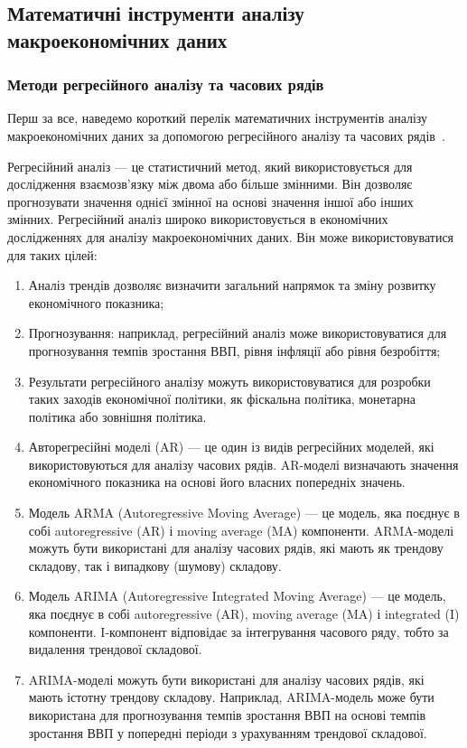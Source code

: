 \subsection{Математичні інструменти аналізу макроекономічних даних  }

\subsubsection{Методи регресійного аналізу та часових рядів}

Перш за все, наведемо короткий перелік математичних інструментів аналізу макроекономічних даних за допомогою регресійного аналізу та часових рядів~\cite{Biduk2016}.

Регресійний аналіз --- це статистичний метод, який використовується для дослідження взаємозв'язку між двома або більше змінними. Він дозволяє прогнозувати значення однієї змінної на основі значення іншої або інших змінних.
Регресійний аналіз широко використовується в економічних дослідженнях для аналізу макроекономічних даних. Він може використовуватися для таких цілей:
\begin{enumerate}
    \item Аналіз трендів дозволяє визначити загальний напрямок та зміну розвитку економічного показника;
    \item Прогнозування: наприклад, регресійний аналіз може використовуватися для прогнозування темпів зростання ВВП, рівня інфляції або рівня безробіття;
    \item Результати регресійного аналізу можуть використовуватися для розробки таких заходів економічної політики, як фіскальна політика, монетарна політика або зовнішня політика.
    \item Авторегресійні моделі (AR) --- це один із видів регресійних моделей, які використовуються для аналізу часових рядів. AR-моделі визначають значення економічного показника на основі його власних попередніх значень.
    \item Модель ARMA (Autoregressive Moving Average) --- це модель, яка поєднує в собі autoregressive (AR) і moving average (MA) компоненти. ARMA-моделі можуть бути використані для аналізу часових рядів, які мають як трендову складову, так і випадкову (шумову) складову.
    \item Модель ARIMA (Autoregressive Integrated Moving Average) --- це модель, яка поєднує в собі autoregressive (AR), moving average (MA) і integrated (I) компоненти. I-компонент відповідає за інтегрування часового ряду, тобто за видалення трендової складової.
    \item ARIMA-моделі можуть бути використані для аналізу часових рядів, які мають істотну трендову складову. Наприклад, ARIMA-модель може бути використана для прогнозування темпів зростання ВВП на основі темпів зростання ВВП у попередні періоди з урахуванням трендової складової.
\end{enumerate}

